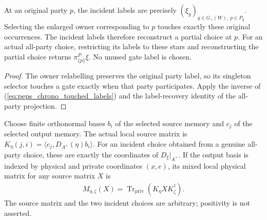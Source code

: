 \begin{definition}
    \label{def:peps_chrono_incident_labels}
    \leanok
    At an original party $p$, the incident labels are precisely
    $(\xi_g)_{g\in G_+(W),\ p\in P_g}$.
    Selecting the enlarged owner corresponding to $p$ touches exactly these
    original occurrences. The incident labels therefore reconstruct a partial
    choice at $p$. For an actual all-party choice, restricting its labels to these
    stars and reconstructing the partial choice returns $\pi_{\{p\}}^P\xi$.
    No unused gate label is chosen.
\end{definition}

\begin{proof}
    \leanok
    The owner relabelling preserves the original party label, so its singleton
    selector touches a gate exactly when that party participates. Apply the
    inverse of (\ref{eq:peps_chrono_touched_labels}) and the label-recovery
    identity of the all-party projection.
\end{proof}

\begin{definition}
    \label{def:peps_chrono_local_matrices}
    \leanok
    Choose finite orthonormal bases $b_i$ of the selected source memory and
    $c_j$ of the selected output memory. The actual local source matrix is
    $K_\eta(j,i)=\langle c_j,D_{A^+}(\eta)b_i\rangle$.
    For an incident choice obtained from a genuine all-party choice, these are
    exactly the coordinates of $D_\xi|_{A^+}$.
    If the output basis is indexed by physical and private coordinates
    $(x,e)$, its mixed local physical matrix for any source matrix $X$ is
    \begin{align}
        M_{\eta,\zeta}(X)=\operatorname{Tr}_{\mathrm{priv}}
        (K_\eta X K_\zeta^\dagger).
        \label{eq:peps_chrono_local_matrices}
    \end{align}
    The source matrix and the two incident choices are arbitrary; positivity
    is not asserted.
\end{definition}

